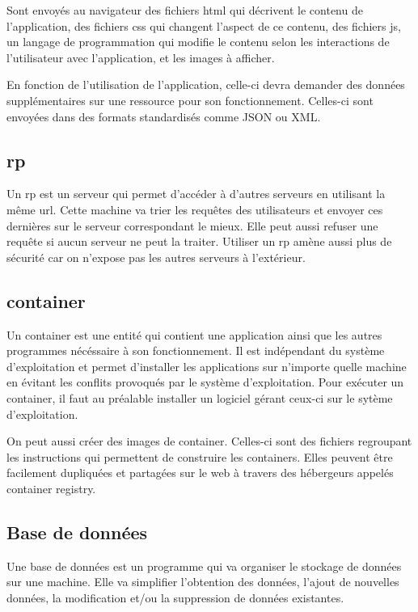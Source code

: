 \documentclass[
    iai, %
    il, %
]{heig-tb}
\begin{document}
Sont envoyés au navigateur des fichiers \gls{html} qui décrivent le contenu de l'application, des fichiers \gls{css} qui changent l'aspect de ce contenu,
des fichiers \gls{js}, un langage de programmation qui modifie le contenu selon les interactions de l'utilisateur avec l'application, et
les images à afficher.

En fonction de l'utilisation de l'application, celle-ci devra demander des données supplémentaires sur une ressource pour son fonctionnement.
Celles-ci sont envoyées dans des formats standardisés comme JSON ou XML.

\subsection{\Gls{rp}}
Un \gls{rp} est un serveur qui permet d'accéder à d'autres serveurs en utilisant la même url.
Cette machine va trier les requêtes des utilisateurs
et envoyer ces dernières sur le serveur correspondant le mieux.
Elle peut aussi refuser une requête si aucun serveur ne peut la traiter.
Utiliser un \gls{rp} amène aussi plus de sécurité car on n'expose pas les autres serveurs à l'extérieur.

\subsection{\Gls{container}}
Un container est une entité qui contient une application ainsi que les autres programmes nécéssaire à son fonctionnement.
Il est indépendant du système d'exploitation et permet d'installer les applications sur n'importe quelle machine en évitant les conflits provoqués par le système d'exploitation.
Pour exécuter un container, il faut au préalable installer un logiciel gérant ceux-ci sur le sytème d'exploitation.

On peut aussi créer des images de container. Celles-ci sont des fichiers regroupant les instructions qui permettent de construire les containers.
Elles peuvent être facilement dupliquées et partagées sur le web à travers des hébergeurs appelés container registry.

\subsection{Base de données}
Une base de données est un programme qui va organiser le stockage de données sur une machine.
Elle va simplifier l'obtention des données, l'ajout de nouvelles données, la modification et/ou la suppression de données existantes.
\end{document}
